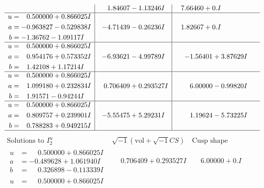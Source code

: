 \documentclass[1p]{elsarticle_modified}
\theoremstyle{definition}
\newcommand{\I}{\sqrt{-1}}
\begin{document}
$$\begin{array}{c|c|c}
 & \phantom{-}1.84607 - 1.13246 I & \phantom{-}7.66460 + 0. I\phantom{ +0.000000I} \\ \hline\begin{aligned}
u &= \phantom{-}0.500000 + 0.866025 I \\
a &= -0.963827 - 0.529838 I \\
b &= -1.36762 - 1.09117 I\end{aligned}
 & -4.71439 - 0.26236 I & \phantom{-}1.82667 + 0. I\phantom{ +0.000000I} \\ \hline\begin{aligned}
u &= \phantom{-}0.500000 + 0.866025 I \\
a &= \phantom{-}0.954176 + 0.573352 I \\
b &= \phantom{-}1.42108 + 1.17214 I\end{aligned}
 & -6.93621 - 4.99789 I & -1.56401 + 3.87629 I \\ \hline\begin{aligned}
u &= \phantom{-}0.500000 + 0.866025 I \\
a &= \phantom{-}1.099180 + 0.232834 I \\
b &= \phantom{-}1.91571 - 0.94244 I\end{aligned}
 & \phantom{-}0.706409 + 0.293527 I & \phantom{-}6.00000 - 0.99820 I \\ \hline\begin{aligned}
u &= \phantom{-}0.500000 + 0.866025 I \\
a &= \phantom{-}0.809757 + 0.239901 I \\
b &= \phantom{-}0.788283 + 0.949215 I\end{aligned}
 & -5.55475 + 5.29231 I & \phantom{-}1.19624 - 5.73225 I\\
 \hline 
 \end{array}$$\newpage$$\begin{array}{c|c|c}  
\text{Solutions to }I^u_{2}& \I (\text{vol} + \sqrt{-1}CS) & \text{Cusp shape}\\
 \hline 
\begin{aligned}
u &= \phantom{-}0.500000 + 0.866025 I \\
a &= -0.489628 + 1.061940 I \\
b &= \phantom{-}0.326898 - 0.113339 I\end{aligned}
 & \phantom{-}0.706409 + 0.293527 I & \phantom{-}6.00000 + 0. I\phantom{ +0.000000I} \\ \hline\begin{aligned}
u &= \phantom{-}0.500000 + 0.866025 I \\

\end{aligned}
\end{array}$$
\end{document}

